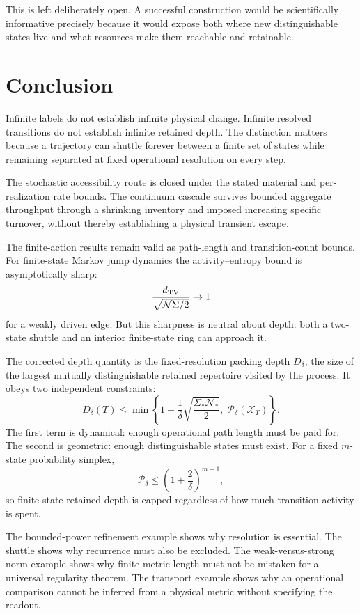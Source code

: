 \documentclass[11pt,a4paper]{article}
\theoremstyle{definition}
\numberwithin{equation}{section}
\begin{document}
This is left deliberately open. A successful construction would be
scientifically informative precisely because it would expose both where new
distinguishable states live and what resources make them reachable and
retainable.

\section{Conclusion}

Infinite labels do not establish infinite physical change. Infinite resolved
transitions do not establish infinite retained depth. The distinction matters
because a trajectory can shuttle forever between a finite set of states while
remaining separated at fixed operational resolution on every step.

The stochastic accessibility route is closed under the stated material and
per-realization rate bounds. The continuum cascade survives bounded aggregate
throughput through a shrinking inventory and imposed increasing specific
turnover, without thereby establishing a physical transient escape.

The finite-action results remain valid as path-length and transition-count
bounds. For finite-state Markov jump dynamics the activity--entropy bound is
asymptotically sharp:
\[
\frac{d_{\rm TV}}{\sqrt{\mathcal N\Sigma/2}}
\to1
\]
for a weakly driven edge. But this sharpness is neutral about depth: both a
two-state shuttle and an interior finite-state ring can approach it.

The corrected depth quantity is the fixed-resolution packing depth
$D_\delta$, the size of the largest mutually distinguishable retained
repertoire visited by the process. It obeys two independent constraints:
\[
\boxed{
D_\delta(T)
\le
\min\left\{
1+\frac1\delta\sqrt{\frac{\Sigma_*\mathcal N_*}{2}},
\;
\mathcal P_\delta(\mathcal X_T)
\right\}.
}
\]
The first term is dynamical: enough operational path length must be paid for.
The second is geometric: enough distinguishable states must exist. For a fixed
$m$-state probability simplex,
\[
\mathcal P_\delta
\le
\left(1+\frac2\delta\right)^{m-1},
\]
so finite-state retained depth is capped regardless of how much transition
activity is spent.

The bounded-power refinement example shows why resolution is essential. The
shuttle shows why recurrence must also be excluded. The weak-versus-strong norm
example shows why finite metric length must not be mistaken for a universal
regularity theorem. The transport example shows why an operational comparison
cannot be inferred from a physical metric without specifying the readout.
\end{document}
